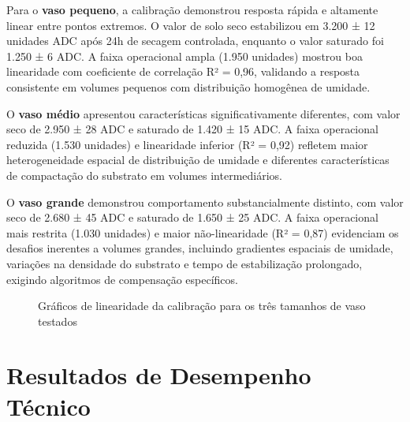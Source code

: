 Para o \textbf{vaso pequeno}, a calibração demonstrou resposta rápida e altamente linear entre pontos extremos. O valor de solo seco estabilizou em 3.200 ± 12 unidades ADC após 24h de secagem controlada, enquanto o valor saturado foi 1.250 ± 6 ADC. A faixa operacional ampla (1.950 unidades) mostrou boa linearidade com coeficiente de correlação R² = 0,96, validando a resposta consistente em volumes pequenos com distribuição homogênea de umidade.

O \textbf{vaso médio} apresentou características significativamente diferentes, com valor seco de 2.950 ± 28 ADC e saturado de 1.420 ± 15 ADC. A faixa operacional reduzida (1.530 unidades) e linearidade inferior (R² = 0,92) refletem maior heterogeneidade espacial de distribuição de umidade e diferentes características de compactação do substrato em volumes intermediários.

O \textbf{vaso grande} demonstrou comportamento substancialmente distinto, com valor seco de 2.680 ± 45 ADC e saturado de 1.650 ± 25 ADC. A faixa operacional mais restrita (1.030 unidades) e maior não-linearidade (R² = 0,87) evidenciam os desafios inerentes a volumes grandes, incluindo gradientes espaciais de umidade, variações na densidade do substrato e tempo de estabilização prolongado, exigindo algoritmos de compensação específicos.

\begin{figure}[htbp]
\centering
\caption{Gráficos de linearidade da calibração para os três tamanhos de vaso testados}
\label{fig:graficos_linearidade}
\end{figure}

\section{Resultados de Desempenho Técnico}

